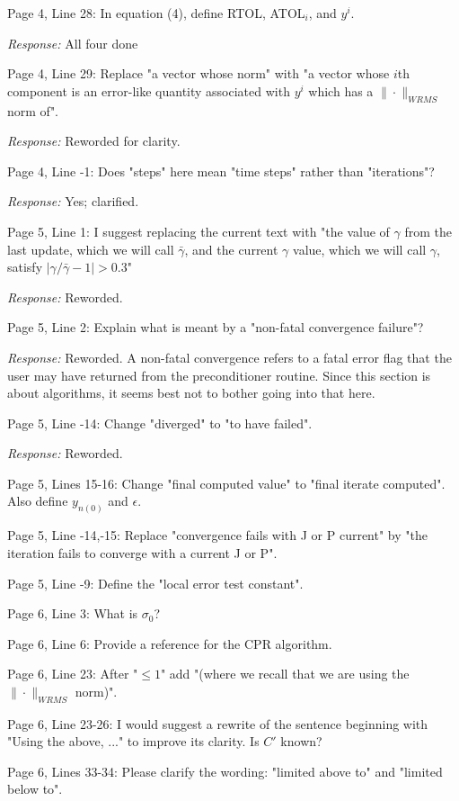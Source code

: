 \documentclass[12pt]{letter}
\begin{document}
Page 4, Line 28: In equation (4), define RTOL, ATOL$_i$, and $y^i$.

{\em Response:} All four done

Page 4, Line 29: Replace "a vector whose norm" with "a vector whose $i$th
component is an error-like quantity associated with $y^i$ which has a
$\|\cdot\|_{WRMS}$ norm of".

{\em Response:} Reworded for clarity.

Page 4, Line -1: Does "steps" here mean "time steps" rather than "iterations"?

{\em Response:} Yes; clarified.

Page 5, Line 1: I suggest replacing the current text with "the value
of $\gamma$ from the last update, which we will call $\bar{\gamma}$,
and the current $\gamma$ value, which we will call $\gamma$, satisfy
$|\gamma/\bar{\gamma} - 1| > 0.3 $"

{\em Response:} Reworded.

Page 5, Line 2: Explain what is meant by a "non-fatal convergence failure"?

{\em Response:} Reworded.  A non-fatal convergence refers to a fatal
error flag that the user may have returned from the preconditioner
routine.  Since this section is about algorithms, it seems best not to
bother going into that here.

Page 5, Line -14: Change "diverged" to "to have failed".

{\em Response:} Reworded.

Page 5, Lines 15-16: Change "final computed value" to "final iterate
computed". Also define $y_{n(0)}$ and $\epsilon$.

Page 5, Line -14,-15: Replace "convergence fails with J or P current" by
"the iteration fails to converge with a current J or P".

Page 5, Line -9: Define the "local error test constant".

Page 6, Line 3: What is $\sigma_ 0$?

Page 6, Line 6: Provide a reference for the CPR algorithm.

Page 6, Line 23: After "$ \leq 1$" add "(where we recall that we are
using the $\|\cdot\|_{WRMS}$ norm)".

Page 6, Line 23-26: I would suggest a rewrite of the sentence beginning
with "Using the above, ..."  to improve its clarity. Is $C'$ known?

Page 6, Lines 33-34: Please clarify the wording: "limited above to" and
"limited below to".
\end{document}
